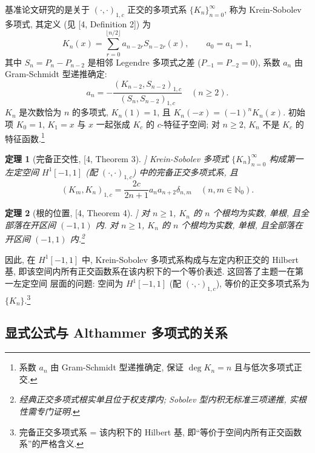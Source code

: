 \documentclass[UTF8]{ctexart}
\newtheorem{theorem}{定理}[section]
\begin{document}
基准论文研究的是关于 $(\cdot, \cdot)_{1,c}$ 正交的多项式系 $\{K_n\}_{n=0}^{\infty}$,
称为 Krein-Sobolev 多项式, 其定义 (见 [4, Definition 2]) 为
\begin{equation}
	K_n(x) = \sum_{r=0}^{\lfloor n/2 \rfloor} a_{n-2r} S_{n-2r}(x), \qquad
	a_0 = a_1 = 1,
\end{equation}
其中 $S_n = P_n - P_{n-2}$ 是相邻 Legendre 多项式之差 ($P_{-1} = P_{-2} = 0$),
系数 $a_n$ 由 Gram-Schmidt 型递推确定:
\begin{equation}
	a_n = -\frac{(K_{n-2}, S_{n-2})_{1,c}}{(S_n, S_{n-2})_{1,c}} \quad (n \geq 2).
\end{equation}
$K_n$ 是次数恰为 $n$ 的多项式, $K_n(1) = 1$, 且 $K_n(-x) = (-1)^n K_n(x)$.
初始项 $K_0 = 1$, $K_1 = x$ 与 $x$ 一起张成 $K_c$ 的 $c$-特征子空间; 对 $n \geq 2$,
$K_n$ 不是 $K_c$ 的特征函数.\footnote{系数 $a_n$ 由 Gram-Schmidt 型递推确定, 保证 $\deg K_n = n$ 且与低次多项式正交.}

\begin{theorem}[完备正交性, [4, Theorem 3]]
Krein-Sobolev 多项式 $\{K_n\}_{n=0}^{\infty}$ 构成第一左定空间 $H^1[-1,1]$
(配 $(\cdot, \cdot)_{1,c}$) 中的完备正交多项式系, 且
\begin{equation}
	(K_m, K_n)_{1,c} = \frac{2c}{2n+1} a_n a_{n+2} \delta_{n,m} \quad (n, m \in \mathbb{N}_0).
\end{equation}
\end{theorem}

\begin{theorem}[根的位置, [4, Theorem 4]]
对 $n \geq 1$, $K_n$ 的 $n$ 个根均为实数, 单根, 且全部落在开区间 $(-1, 1)$ 内.
对 $n \geq 1$, $K_n$ 的 $n$ 个根均为实数, 单根, 且全部落在开区间 $(-1, 1)$ 内.\footnote{经典正交多项式根实单且位于权支撑内; Sobolev 型内积无标准三项递推, 实根性需专门证明.}
\end{theorem}

因此, 在 $H^1[-1,1]$ 中, Krein-Sobolev 多项式系构成与左定内积正交的 Hilbert 基,
即该空间内所有正交函数系在该内积下的一个等价表述. 这回答了主题一在第一左定空间
层面的问题: 空间为 $H^1[-1,1]$ (配 $(\cdot, \cdot)_{1,c}$), 等价的正交多项式系为
$\{K_n\}$.\footnote{完备正交多项式系 = 该内积下的 Hilbert 基, 即``等价于空间内所有正交函数系''的严格含义.}

\subsection{显式公式与 Althammer 多项式的关系}
\end{document}
